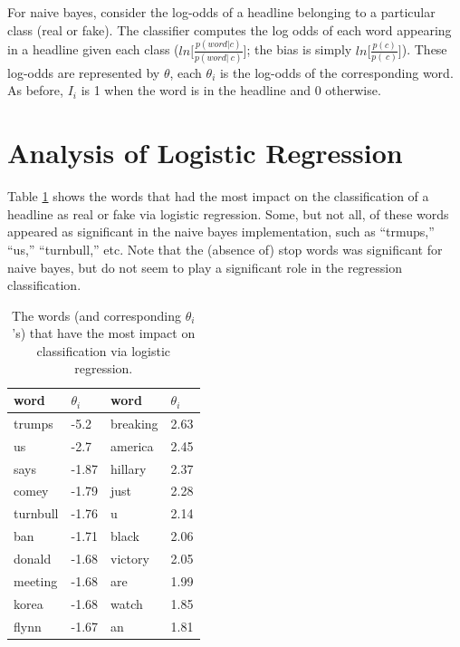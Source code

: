 \documentclass{article}
\renewcommand{\arraystretch}{1.25}
\begin{document}
   For naive bayes, consider the log-odds of a headline belonging to a particular class (real or fake). The
   classifier computes the log odds of each word appearing in a headline given each class
   ($ln \big[ \frac{p(word | c)}{p(word | ~c)} \big]$; the bias is simply $ln \big[ \frac{p(c)}{p(~c)}\big]$).
   These log-odds are represented by $\theta$, each $\theta_i$ is the log-odds of the corresponding word.
   As before, $I_i$ is 1 when the word is in the headline and 0 otherwise.



   \section{Analysis of Logistic Regression}
   Table \ref{part6table} shows the words that had the most impact on the classification of a headline
   as real or fake via logistic regression. Some, but not all, of these words appeared as significant
   in the naive bayes implementation, such as ``trmups,'' ``us,'' ``turnbull,'' etc. Note that the (absence
   of) stop words was significant for naive bayes, but do not seem to play a significant role in
   the regression classification.

   \begin{table}[h]
      \centering
      \renewcommand{\arraystretch}{1.5}

      \begin{tabular}{ p{7em}|l || p{7em}|l }
         \hline
         word     &     $\theta_i$   & word & $\theta_i$   \\
         \hline \hline
         trumps      &     -5.2        &  breaking    & 2.63    \\
         us          &     -2.7        &  america     & 2.45    \\
         says        &     -1.87       &  hillary     & 2.37    \\
         comey       &     -1.79       &  just        & 2.28    \\
         turnbull    &     -1.76       &  u           & 2.14    \\
         ban         &     -1.71       &  black       & 2.06    \\
         donald      &     -1.68       &  victory     & 2.05    \\
         meeting     &     -1.68       &  are         & 1.99    \\
         korea       &     -1.68       &  watch       & 1.85    \\
         flynn       &     -1.67       &  an          & 1.81    \\
         \hline
      \end{tabular}

      \caption{ The words (and corresponding $\theta_i$'s) that have the most impact
               on classification via logistic regression.}
      \label{part6table}
   \end{table}
\end{document}
